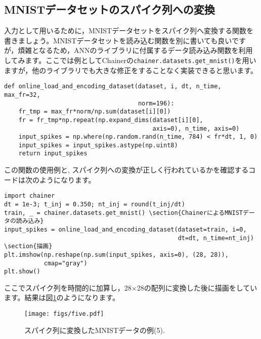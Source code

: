 \subsection{MNISTデータセットのスパイク列への変換}
入力として用いるために，MNISTデータセットをスパイク列へ変換する関数を書きましょう。MNISTデータセットを読み込む関数を別に書いても良いですが，煩雑となるため，ANNのライブラリに付属するデータ読み込み関数を利用してみます。ここでは例としてChainerの\texttt{chainer.datasets.get\_mnist()}を用いますが，他のライブラリでも大きな修正をすることなく実装できると思います。
\begin{verbatim}
def online_load_and_encoding_dataset(dataset, i, dt, n_time, max_fr=32,
                                     norm=196):
    fr_tmp = max_fr*norm/np.sum(dataset[i][0])
    fr = fr_tmp*np.repeat(np.expand_dims(dataset[i][0],
                                         axis=0), n_time, axis=0)
    input_spikes = np.where(np.random.rand(n_time, 784) < fr*dt, 1, 0)
    input_spikes = input_spikes.astype(np.uint8)
    return input_spikes
\end{verbatim}
この関数の使用例と, スパイク列への変換が正しく行われているかを確認するコードは次のようになります。
\begin{verbatim}
import chainer
dt = 1e-3; t_inj = 0.350; nt_inj = round(t_inj/dt)
train, _ = chainer.datasets.get_mnist() \section{ChainerによるMNISTデータの読み込み}
input_spikes = online_load_and_encoding_dataset(dataset=train, i=0,
                                                dt=dt, n_time=nt_inj)
\section{描画}
plt.imshow(np.reshape(np.sum(input_spikes, axis=0), (28, 28)),
           cmap="gray")
plt.show()
\end{verbatim}
ここでスパイク列を時間的に加算し，28$\times$28の配列に変換した後に描画をしています。結果は図\ref{fig:jitteredMNIST}のようになります。
\begin{figure}[htbp]
    \centering
    \texttt{[image: figs/five.pdf]}
    \caption{スパイク列に変換したMNISTデータの例(5).}
    \label{fig:jitteredMNIST}
\end{figure}
